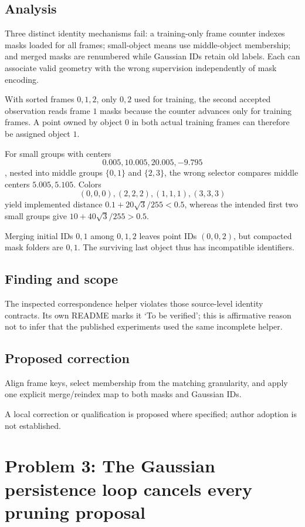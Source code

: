\documentclass[11pt]{article}
\begin{document}
\subsection*{Analysis}

Three distinct identity mechanisms fail: a training-only frame counter indexes masks loaded for all frames; small-object means use middle-object membership; and merged masks are renumbered while Gaussian IDs retain old labels. Each can associate valid geometry with the wrong supervision independently of mask encoding.

With sorted frames \(0,1,2\), only \(0,2\) used for training, the second accepted observation reads frame \(1\) masks because the counter advances only for training frames. A point owned by object \(0\) in both actual training frames can therefore be assigned object \(1\).

For small groups with centers \[0.005,10.005,20.005,-9.795\], nested into middle groups \(\{0,1\}\) and \(\{2,3\}\), the wrong selector compares middle centers \(5.005,5.105\). Colors \[(0,0,0),(2,2,2),(1,1,1),(3,3,3)\] yield implemented distance \(0.1+20\sqrt3/255<0.5\), whereas the intended first two small groups give \(10+40\sqrt3/255>0.5\).

Merging initial IDs \(0,1\) among \(0,1,2\) leaves point IDs \((0,0,2)\), but compacted mask folders are \(0,1\). The surviving last object thus has incompatible identifiers.

\subsection*{Finding and scope}

The inspected correspondence helper violates those source-level identity contracts. Its own README marks it ‘To be verified’; this is affirmative reason not to infer that the published experiments used the same incomplete helper.

\subsection*{Proposed correction}

Align frame keys, select membership from the matching granularity, and apply one explicit merge/reindex map to both masks and Gaussian IDs.

A local correction or qualification is proposed where specified; author adoption is not established.

\section*{Problem 3: The Gaussian persistence loop cancels every pruning proposal}
\end{document}
